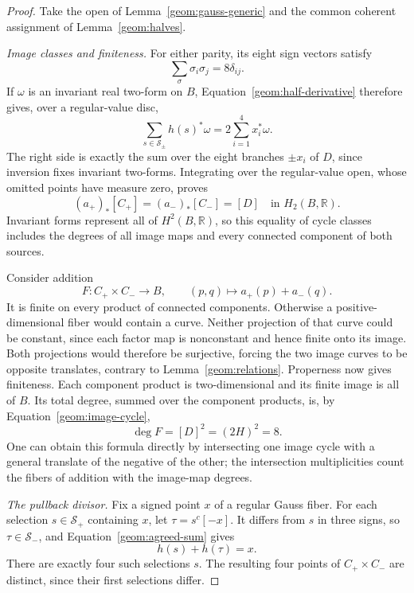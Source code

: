 \documentclass[11pt]{amsart}
\newcommand{\R}{\mathbb R}
\theoremstyle{definition}
\theoremstyle{remark}
\numberwithin{equation}{section}
\begin{document}
\begin{proof}
Take the open of Lemma~\ref{geom:gauss-generic} and the common
coherent assignment of Lemma~\ref{geom:halves}.

\smallskip\noindent
\emph{Image classes and finiteness.}
For either parity, its eight sign vectors satisfy
\[
 \sum_\sigma\sigma_i\sigma_j=8\delta_{ij}.
\]
If $\omega$ is an invariant real two-form on $B$,
Equation~\eqref{geom:half-derivative} therefore gives, over a
regular-value disc,
\[
 \sum_{s\in\mathcal S_\pm}h(s)^*\omega
       =2\sum_{i=1}^4x_i^*\omega.
\]
The right side is exactly the sum over the eight branches $\pm x_i$
of $D$, since inversion fixes invariant two-forms.  Integrating over
the regular-value open, whose omitted points have measure zero,
proves
\begin{equation}\label{geom:image-cycle}
 (a_+)_*[C_+]=(a_-)_*[C_-]=[D]
 \quad\text{in }H_2(B,\R).
\end{equation}
Invariant forms represent all of $H^2(B,\R)$, so this equality of
cycle classes includes the degrees of all image maps and every
connected component of both sources.

Consider addition
\[
 F:C_+\times C_-\longrightarrow B,\qquad
 (p,q)\longmapsto a_+(p)+a_-(q).
\]
It is finite on every product of connected components.  Otherwise
a positive-dimensional fiber would contain a curve.  Neither
projection of that curve could be constant, since each factor map is
nonconstant and hence finite onto its image.  Both projections would
therefore be surjective, forcing the two image curves to be opposite
translates, contrary to Lemma~\ref{geom:relations}.  Properness now
gives finiteness.  Each component product is two-dimensional and its
finite image is all of $B$.  Its total degree, summed over the
component products, is, by Equation~\eqref{geom:image-cycle},
\begin{equation}\label{geom:addition-degree}
 \deg F=[D]^2=(2H)^2=8.
\end{equation}
One can obtain this formula directly by intersecting one image cycle
with a general translate of the negative of the other; the
intersection multiplicities count the fibers of addition with the
image-map degrees.

\smallskip\noindent
\emph{The pullback divisor.}
Fix a signed point $x$ of a regular Gauss fiber.  For each selection
$s\in\mathcal S_+$ containing $x$, let $\tau=s^c[-x]$.
It differs from $s$ in three signs, so $\tau\in\mathcal S_-$,
and Equation~\eqref{geom:agreed-sum} gives
\begin{equation}\label{geom:four-pairs}
 h(s)+h(\tau)=x.
\end{equation}
There are exactly four such selections $s$.  The resulting four
points of $C_+\times C_-$ are distinct, since their first selections
differ.


\end{proof}
\end{document}
